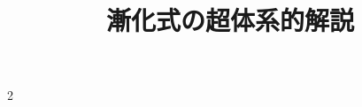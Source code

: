 \documentclass[dvipdfmx,a4paper,11pt,fleqn,openany,multicol]{jsbook}
\title{漸化式の超体系的解説}
\begin{document}
\date{}
\author{}
\maketitle
\tableofcontents

\begin{multicols*}{2}






\end{multicols*}
\end{document}
